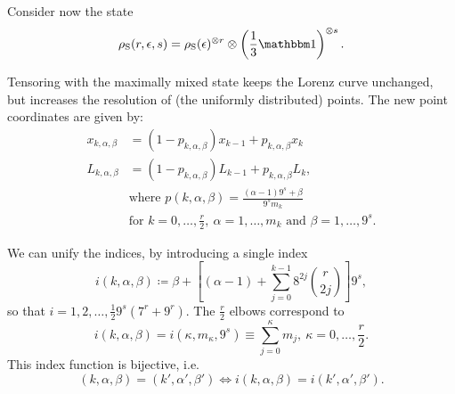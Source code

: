 Consider now the state 
\begin{equation}
    \noisys(r, \epsilon, s) = \noisys(\epsilon)\too{r} \otimes \left( \frac{1}{3}\id \right)\too{s}.
\end{equation}

Tensoring with the maximally mixed state keeps the Lorenz curve unchanged, but increases the resolution of (the uniformly distributed) points.
The new point coordinates are given by:
\begin{align}
    x_{k,\alpha, \beta} &= \left( 1-p_{k,\alpha, \beta}\right) x_{k-1} + p_{k,\alpha, \beta} x_k \label{eq:lcsu_xcoord}\\
    L_{k,\alpha, \beta} &= \left( 1-p_{k,\alpha, \beta} \right) L_{k-1} + p_{k,\alpha, \beta} L_k, \label{eq:lcsu_lcoord}\\
    &\text{where } p(k, \alpha, \beta) = \frac{(\alpha-1)9^s + \beta}{9^s m_k} \\
    &\text{for } k=0,\dots,\frac{r}{2},\ \alpha = 1,\dots,m_k \text{ and } \beta = 1,\dots,9^s. \nonumber
\end{align}

We can unify the indices, by introducing a single index
\begin{equation}
    i(k,\alpha,\beta) \coloneqq \beta + \left[ (\alpha-1) + \sum_{j=0}^{k-1} 8^{2j}\binom{r}{2j} \right]9^s,
\end{equation}
so that $i=1,2,\dots, \frac{1}{2}9^s(7^{r} + 9^{r})$.
The $\frac{r}{2}$ elbows correspond to 
\begin{equation}
	i(k, \alpha, \beta) = i(\kappa, m_{\kappa}, 9^s) \equiv \sum_{j=0}^{\kappa} m_j,\ \kappa = 0,\dots,\frac{r}{2}.
\end{equation}
This index function is bijective, i.e.
\begin{equation}
	(k, \alpha, \beta) = (k', \alpha', \beta') \Leftrightarrow i(k, \alpha, \beta) = i(k', \alpha', \beta').
\end{equation}





